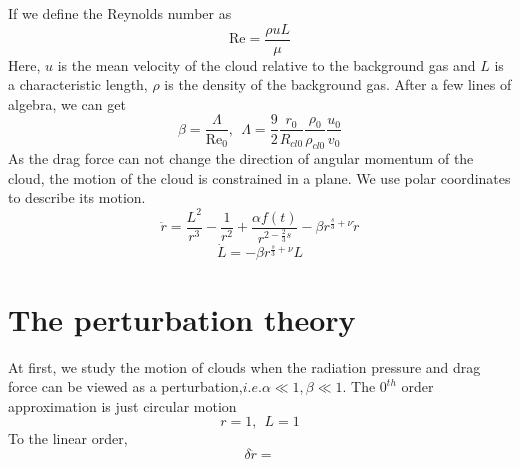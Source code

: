 \documentclass{article}
\begin{document}
If we define the Reynolds number as
\begin{equation}
\mathrm{Re} = \frac{\rho u L}{\mu}
\end{equation}
Here, $u$ is the mean velocity of the cloud relative to the background gas and $L$ is a characteristic length, $\rho$ is the density of the background gas. After a few lines of algebra, we can get
\begin{equation}
\beta = \frac{\Lambda}{\mathrm{Re}_0},\ \ \Lambda = \frac{9}{2} \frac{r_0}{R_{cl0}} \frac{\rho_0}{\rho_{cl0}} \frac{u_0}{v_0} 
\end{equation}
As the drag force can not change the direction of angular momentum of the cloud, the motion of the cloud is constrained in a plane. We use polar coordinates to describe its motion.
\begin{equation}
\ddot{r} = \frac{L^2}{r^3} - \frac{1}{r^2} + \frac{\alpha f(t)}{r^{2-\frac{2}{3}s}} - \beta r^{\frac{s}{3}+\nu}\dot{r}
\end{equation}
\begin{equation}
\dot{L} = - \beta r^{\frac{s}{3}+\nu}L
\end{equation}



\section{The perturbation theory}
At first, we study the motion of clouds when the radiation pressure and drag force can be viewed as a perturbation,$i.e. \alpha \ll 1, \beta \ll 1$. The $0^{th}$ order approximation is just circular motion
\begin{equation}
r=1, \ \ L=1
\end{equation}
To the linear order,
\begin{equation}
\delta\ddot{r} = 
\end{equation}
\end{document}
